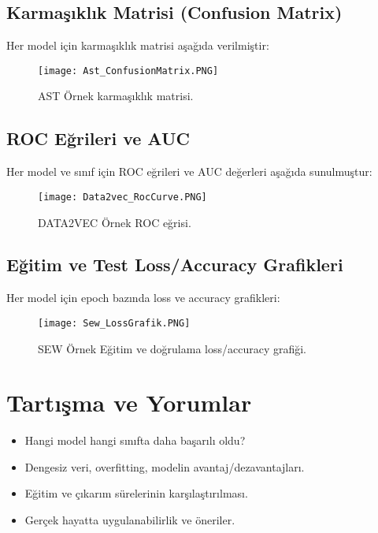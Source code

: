 \documentclass[conference]{IEEEtran}
\begin{document}
\FloatBarrier

\subsection{Karmaşıklık Matrisi (Confusion Matrix)}
Her model için karmaşıklık matrisi aşağıda verilmiştir:

\begin{figure}[h]
    \centering
    \texttt{[image: Ast\_ConfusionMatrix.PNG]}
    \caption{AST Örnek karmaşıklık matrisi.}
\end{figure}

\subsection{ROC Eğrileri ve AUC}
Her model ve sınıf için ROC eğrileri ve AUC değerleri aşağıda sunulmuştur:

\begin{figure}[h]
    \centering
    \texttt{[image: Data2vec\_RocCurve.PNG]}
    \caption{DATA2VEC Örnek ROC eğrisi.}
\end{figure}

\subsection{Eğitim ve Test Loss/Accuracy Grafikleri}
Her model için epoch bazında loss ve accuracy grafikleri:

\begin{figure}[h]
    \centering
    \texttt{[image: Sew\_LossGrafik.PNG]}
    \caption{SEW Örnek Eğitim ve doğrulama loss/accuracy grafiği.}
\end{figure}

\section{Tartışma ve Yorumlar}
\begin{itemize}
    \item Hangi model hangi sınıfta daha başarılı oldu?
    \item Dengesiz veri, overfitting, modelin avantaj/dezavantajları.
    \item Eğitim ve çıkarım sürelerinin karşılaştırılması.
    \item Gerçek hayatta uygulanabilirlik ve öneriler.
\end{itemize}
\end{document}
